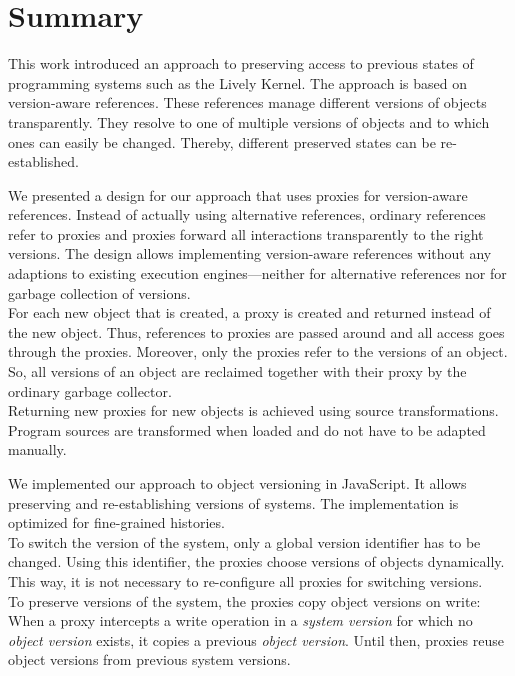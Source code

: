 \chapter{Summary} \label{chapter:SUMMARY}

This work introduced an approach to preserving access to previous states of programming systems such as the Lively Kernel.
The approach is based on version-aware references.
These references manage different versions of objects transparently.
They resolve to one of multiple versions of objects and to which ones can easily be changed.
Thereby, different preserved states can be re-established.

We presented a design for our approach that uses proxies for version-aware references.
Instead of actually using alternative references, ordinary references refer to proxies and proxies forward all interactions transparently to the right versions.
The design allows implementing version-aware references without any adaptions to existing execution engines---neither for alternative references nor for garbage collection of versions.\\
For each new object that is created, a proxy is created and returned instead of the new object.
Thus, references to proxies are passed around and all access goes through the proxies.
Moreover, only the proxies refer to the versions of an object.
So, all versions of an object are reclaimed together with their proxy by the ordinary garbage collector.\\
Returning new proxies for new objects is achieved using source transformations.
Program sources are transformed when loaded and do not have to be adapted manually.

We implemented our approach to object versioning in JavaScript.
It allows preserving and re-establishing versions of systems.
The implementation is optimized for fine-grained histories.\\
To switch the version of the system, only a global version identifier has to be changed.
Using this identifier, the proxies choose versions of objects dynamically.
This way, it is not necessary to re-configure all proxies for switching versions.\\
To preserve versions of the system, the proxies copy object versions on write: When a proxy intercepts a write operation in a \emph{system version} for which no \emph{object version} exists, it copies a previous \emph{object version}.
Until then, proxies reuse object versions from previous system versions.

